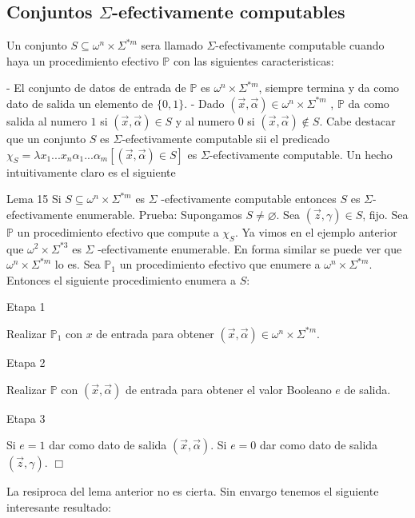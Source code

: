 \subsection{Conjuntos \(\Sigma \)-efectivamente computables}

Un conjunto \(S\subseteq \omega ^{n}\times \Sigma ^{\ast m}\) sera llamado \(\Sigma \)-efectivamente computable cuando haya un procedimiento efectivo \(\mathbb{P}\) con las siguientes caracteristicas:

- El conjunto de datos de entrada de \(\mathbb{P}\) es \(\omega ^{n}\times \Sigma ^{\ast m}\), siempre termina y da como dato de salida un elemento de \(\{0,1\}\).
- Dado \((\vec{x},\vec{\alpha})\in \omega ^{n}\times \Sigma ^{\ast m}\) , \(\mathbb{P}\) da como salida al numero \(1\) si \((\vec{x},\vec{\alpha})\in S\) y al numero \(0\) si \((\vec{x},\vec{\alpha})\notin S.\)
Cabe destacar que un conjunto \(S\) es \(\Sigma \)-efectivamente computable sii el predicado \(\chi _{S}=\lambda x_{1}...x_{n}\alpha _{1}...\alpha _{m}\left[ (\vec{x},\vec{\alpha})\in S\right] \) es \(\Sigma \)-efectivamente computable. Un hecho intuitivamente claro es el siguiente

Lema 15 Si \(S\subseteq \omega ^{n}\times \Sigma ^{\ast m}\) es \(\Sigma \) -efectivamente computable entonces \(S\) es \(\Sigma \)-efectivamente enumerable.
Prueba: Supongamos \(S\neq \varnothing \). Sea \((\vec{z},\gamma )\in S\), fijo. Sea \( \mathbb{P}\) un procedimiento efectivo que compute a \(\chi _{S}\). Ya vimos en el ejemplo anterior que \(\omega ^{2}\times \Sigma ^{\ast 3}\) es \(\Sigma \) -efectivamente enumerable. En forma similar se puede ver que \(\omega ^{n}\times \Sigma ^{\ast m}\) lo es. Sea \(\mathbb{P}_{1}\) un procedimiento efectivo que enumere a \(\omega ^{n}\times \Sigma ^{\ast m}\). Entonces el siguiente procedimiento enumera a \(S\):

Etapa 1

Realizar \(\mathbb{P}_{1}\) con \(x\) de entrada para obtener \((\vec{x} ,\vec{\alpha})\in \omega ^{n}\times \Sigma ^{\ast m}.\)

Etapa 2

Realizar \(\mathbb{P}\) con \((\vec{x},\vec{\alpha})\) de entrada para obtener el valor Booleano \(e\) de salida\(.\)

Etapa 3

Si \(e=1\) dar como dato de salida \((\vec{x},\vec{\alpha}).\) Si \(e=0\) dar como dato de salida \((\vec{z},\gamma )\). \(\Box\)

La resiproca del lema anterior no es cierta. Sin envargo tenemos el siguiente interesante resultado:

